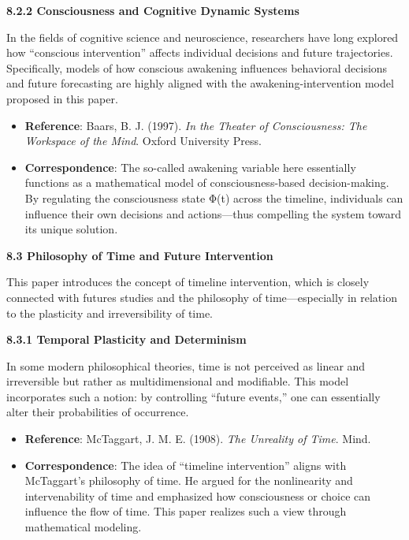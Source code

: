 \documentclass[
]{article}
\begin{document}
\textbf{8.2.2 Consciousness and Cognitive Dynamic Systems}

In the fields of cognitive science and neuroscience, researchers have
long explored how ``conscious intervention'' affects individual
decisions and future trajectories. Specifically, models of how conscious
awakening influences behavioral decisions and future forecasting are
highly aligned with the awakening-intervention model proposed in this
paper.

\begin{itemize}
\item
  \textbf{Reference}: Baars, B. J. (1997). \emph{In the Theater of
  Consciousness: The Workspace of the Mind}. Oxford University Press.
\item
  \textbf{Correspondence}: The so-called awakening variable here
  essentially functions as a mathematical model of consciousness-based
  decision-making. By regulating the consciousness state Φ(t) across the
  timeline, individuals can influence their own decisions and
  actions---thus compelling the system toward its unique solution.
\end{itemize}

\textbf{8.3 Philosophy of Time and Future Intervention}

This paper introduces the concept of timeline intervention, which is
closely connected with futures studies and the philosophy of
time---especially in relation to the plasticity and irreversibility of
time.

\textbf{8.3.1 Temporal Plasticity and Determinism}

In some modern philosophical theories, time is not perceived as linear
and irreversible but rather as multidimensional and modifiable. This
model incorporates such a notion: by controlling ``future events,'' one
can essentially alter their probabilities of occurrence.

\begin{itemize}
\item
  \textbf{Reference}: McTaggart, J. M. E. (1908). \emph{The Unreality of
  Time}. Mind.
\item
  \textbf{Correspondence}: The idea of ``timeline intervention'' aligns
  with McTaggart's philosophy of time. He argued for the nonlinearity
  and intervenability of time and emphasized how consciousness or choice
  can influence the flow of time. This paper realizes such a view
  through mathematical modeling.
\end{itemize}
\end{document}
